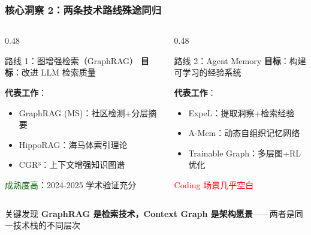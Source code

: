 \documentclass[aspectratio=169,10pt]{beamer}
\begin{document}
\begin{frame}
  \frametitle{核心洞察 2：两条技术路线殊途同归}

  \begin{columns}[T]
    \begin{column}{0.48\textwidth}
      \begin{block}{路线 1：图增强检索（GraphRAG）}
        \footnotesize
        \textbf{目标}：改进 LLM 检索质量

        \vspace{0.2cm}

        \textbf{代表工作}：
        \begin{itemize}
          \item GraphRAG (MS)：社区检测+分层摘要
          \item HippoRAG：海马体索引理论
          \item CGR³：上下文增强知识图谱
        \end{itemize}

        \vspace{0.2cm}

        \textcolor{darkgreen}{成熟度高}：2024-2025 学术验证充分
      \end{block}
    \end{column}

    \begin{column}{0.48\textwidth}
      \begin{block}{路线 2：Agent Memory}
        \footnotesize
        \textbf{目标}：构建可学习的经验系统

        \vspace{0.2cm}

        \textbf{代表工作}：
        \begin{itemize}
          \item ExpeL：提取洞察+检索经验
          \item A-Mem：动态自组织记忆网络
          \item Trainable Graph：多层图+RL优化
        \end{itemize}

        \vspace{0.2cm}

        \textcolor{red}{Coding 场景几乎空白}
      \end{block}
    \end{column}
  \end{columns}

  \vspace{0.3cm}

  \begin{alertblock}{关键发现}
    \textbf{GraphRAG 是检索技术，Context Graph 是架构愿景}——两者是同一技术栈的不同层次
  \end{alertblock}
\end{frame}
\end{document}
